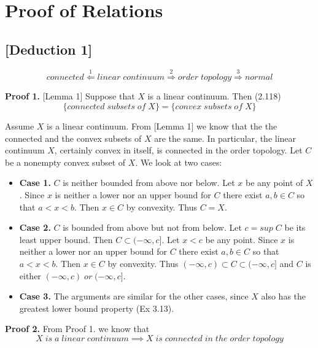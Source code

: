 \documentclass[11pt]{diazessay} %
\begin{document}
\section*{Proof of Relations}

\subsection*{[Deduction 1]}
\vskip -10pt
\begin{equation}
	connected \overset{1}{\Longleftarrow} linear \; continuum \overset{2}{\Longrightarrow} order \; topology \overset{3}{\Longrightarrow} normal
\end{equation}

\vskip 10pt
\textbf{Proof 1.} [Lemma 1] Suppose that $X$ is a linear continuum. Then \cite{1}(2.118)
\begin{equation*}
	\{connected \; subsets \; of \; X\} = \{convex \; subsets \; of \; X\}
\end{equation*}

\vskip -5pt
Assume $X$ is a linear continuum. From [Lemma 1] we know that the the connected and the convex
subsets of $X$ are the same. In particular, the linear continuum $X$, certainly convex in itself, is connected
in the order topology. Let $C$ be a nonempty convex subset of $X$. We look at two cases:
\begin{itemize}
	\item \textbf{Case 1.} $C$ is neither bounded from above nor below. Let $x$ be any point of $X$. Since $x$ is neither a lower
	nor an upper bound for $C$ there exist $a, b \in C$ so that $a < x < b$. Then $x \in C$ by convexity.
	Thus $C = X$.

	\vskip 3pt
	\item\textbf{Case 2.} $C$ is bounded from above but not from below. Let $c = sup\; C$ be its least upper bound. Then
	$C \subset (-\infty, c]$. Let $x < c$ be any point. Since $x$ is neither a lower nor an upper bound for $C$
	there exist $a, b \in C$ so that $a < x < b$. Then $x \in C$ by convexity. Thus $(-\infty, c) \subset C \subset (-\infty, c]$
	and $C$ is either $(-\infty, c) \; or \; (-\infty, c]$.\

	\vskip 3pt
	\item \textbf{Case 3.} The arguments are similar for the other cases, since $X$ also has the greatest lower bound property
	\cite{2} (Ex 3.13).
\end{itemize}

\vskip 10pt
\textbf{Proof 2.} From Proof 1. we know that
\begin{equation*}
	X \; is \; a \; linear \; continuum \implies X \; is \; connected \; in \; the \; order \; topology 
\end{equation*}
\end{document}
